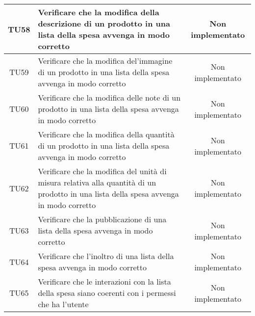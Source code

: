 \begin{center}
\begin{longtable}{|c|>{\centering}m{7cm}|c|}
		TU58 & Verificare che la modifica della descrizione di un prodotto in una lista della spesa avvenga in modo corretto & Non implementato \\ \hline
		TU59 & Verificare che la modifica del'immagine di un prodotto in una lista della spesa avvenga in modo corretto & Non implementato \\ \hline
		TU60 & Verificare che la modifica delle note di un prodotto in una lista della spesa avvenga in modo corretto & Non implementato \\ \hline
		TU61 & Verificare che la modifica della quantità di un prodotto in una lista della spesa avvenga in modo corretto & Non implementato \\ \hline
		TU62 & Verificare che la modifica del unità di misura relativa alla quantità di un prodotto in una lista della spesa avvenga in modo corretto & Non implementato \\ \hline
		TU63 & Verificare che la pubblicazione di una lista della spesa avvenga in modo corretto & Non implementato \\ \hline
		TU64 & Verificare che l'inoltro di una lista della spesa avvenga in modo corretto & Non implementato \\ \hline
		TU65 & Verificare che le interazioni con la lista della spesa siano coerenti con i permessi che ha l'utente & Non implementato \\ \hline
	\end{longtable}
\end{center}
